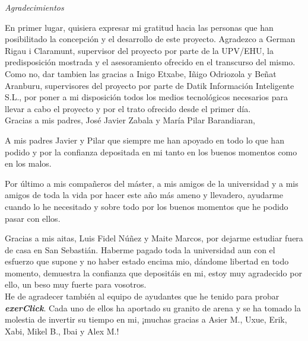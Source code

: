 \begin{flushright}
	\Large\textit{Agradecimientos}
\end{flushright}

En primer lugar, quisiera expresar mi gratitud hacia las personas que han posibilitado la concepción y el desarrollo de este proyecto. Agradezco a German Rigau i Claramunt, supervisor del proyecto por parte de la UPV/EHU, la predisposición mostrada y el asesoramiento ofrecido en el transcurso del mismo. Como no, dar tambien las gracias a Inigo Etxabe, Iñigo Odriozola y Beñat Aranburu, supervisores del proyecto por parte de Datik Información Inteligente S.L., por poner a mi disposición todos los medios tecnológicos necesarios para llevar a cabo el proyecto y por el trato ofrecido desde el primer día.\\


Gracias a mis padres, José Javier Zabala y María Pilar Barandiaran,  


A mis padres Javier y Pilar que siempre me han apoyado en todo lo que han podido y  por la confianza depositada en mi tanto en los buenos momentos como en los malos.

Por último a mis compañeros del máster, a mis amigos de la universidad y a mis amigos de toda la vida por hacer este año más ameno y llevadero, ayudarme cuando lo he necesitado y sobre todo por los buenos momentos que he podido pasar con ellos.



Gracias a mis aitas, Luis Fidel Núñez y Maite Marcos, por dejarme estudiar fuera de casa en San Sebastián. Haberme pagado toda la universidad aun con el esfuerzo que supone y no haber estado encima mio, dándome libertad en todo momento, demuestra la confianza que depositáis en mi, estoy muy agradecido por ello, un beso muy fuerte para vosotros.\\

He de agradecer también al equipo de ayudantes que he tenido para probar \textit{\textbf{exerClick}}. Cada uno de ellos ha aportado su granito de arena y se ha tomado la molestia de invertir su tiempo en mi, ¡muchas gracias a Asier M., Uxue, Erik, Xabi, Mikel B., Ibai y Alex M.!\\

